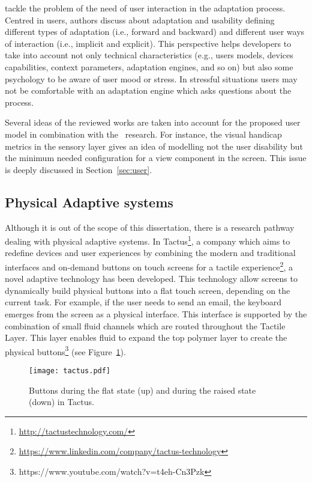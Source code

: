 \citet{evers_achieving_2012} tackle the problem of the need of user interaction 
in the adaptation process. Centred in users, authors discuss about adaptation 
and usability defining different types of adaptation (i.e., forward and backward) 
and different user ways of interaction (i.e., implicit and explicit). This 
perspective helps developers to take into account not only technical 
characteristics (e.g., users models, devices capabilities, context parameters, 
adaptation engines, and so on) but also some psychology to be aware of user mood 
or stress. In stressful situations users may not be comfortable with an adaptation 
engine which asks questions about the process.

Several ideas of the reviewed works are taken into account for the proposed user 
model in combination with the~\citet{casas_user_2008} research. For instance,
the visual handicap metrics in the sensory layer gives an idea of modelling
not the user disability but the minimum needed configuration for a view component
in the screen. This issue is deeply discussed in Section~\ref{sec:user}.

\subsection{Physical Adaptive systems}
\label{sec:pyshical_adaptive_sistems}

Although it is out of the scope of this dissertation, there is a research
pathway dealing with physical adaptive systems. In Tactus\footnote{\url{http://tactustechnology.com/}}, a
company which aims to redefine devices and user experiences by combining the 
modern and traditional interfaces and on-demand buttons on touch
screens for a tactile experience\footnote{\url{https://www.linkedin.com/company/tactus-technology}}, a novel adaptive
technology has been developed. This technology allow screens to dynamically build
physical buttons into a flat touch screen, depending on the current task. For example,
if the user needs to send an email, the keyboard emerges from the screen
as a physical interface. This interface is supported by the combination of
small fluid channels which are routed throughout the Tactile Layer. This layer
enables fluid to expand the top polymer layer to create the physical buttons\footnote{https://www.youtube.com/watch?v=t4eh-Cn3Pzk} 
(see Figure~\ref{fig:tactus}).

\begin{figure}[H]
\centering
\texttt{[image: tactus.pdf]}
\caption{Buttons during the flat state (up) and during the raised state (down) in Tactus.}
\label{fig:tactus}
\end{figure}

